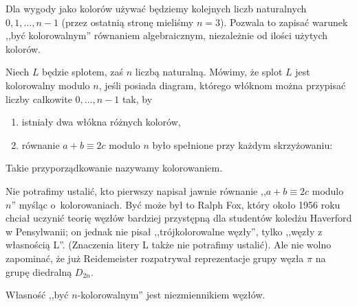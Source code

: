 Dla wygody jako kolorów używać będziemy kolejnych liczb naturalnych $0, 1, \ldots, n-1$
(przez ostatnią stronę mieliśmy $n = 3$).
Pozwala to zapisać warunek ,,być kolorowalnym'' równaniem algebraicznym, niezależnie od ilości użytych kolorów.

\begin{definition}[kolorowanie]
%
\label{def:colouring_equation}%
    Niech $L$ będzie splotem, zaś $n$ liczbą naturalną.
    Mówimy, że splot $L$ jest kolorowalny modulo $n$, jeśli posiada diagram, którego włóknom można przypisać liczby całkowite $0, \ldots, n - 1$ tak, by
    \begin{enumerate}
        \item istniały dwa włókna różnych kolorów,
        \item równanie $a + b \equiv 2c$ modulo $n$ było spełnione przy każdym skrzyżowaniu:
    \end{enumerate}

    Takie przyporządkowanie nazywamy kolorowaniem.
\end{definition}

Nie potrafimy ustalić, kto pierwszy napisał jawnie równanie ,,$a + b \equiv 2c$ modulo $n$'' myśląc o~kolorowaniach.
Być może był to Ralph Fox, który około 1956 roku chciał uczynić teorię węzłów bardziej przystępną dla studentów koledżu Haverford w Pensylwanii; on jednak nie pisał ,,trójkolorowalne węzły'', tylko ,,węzły z własnością L''.
(Znaczenia litery L także nie potrafimy ustalić).
Ale nie wolno zapominać, że już Reidemeister rozpatrywał reprezentacje grupy węzła $\pi$ na grupę diedralną $D_{2n}$.

\begin{proposition}
\label{prp:colouring_invariance}%
    Własność ,,być $n$-kolorowalnym'' jest niezmiennikiem węzłów.
\end{proposition}

